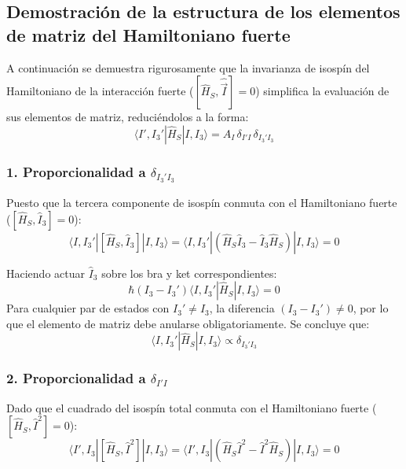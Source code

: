 \subsection{Demostración de la estructura de los elementos de matriz del Hamiltoniano fuerte}

A continuación se demuestra rigurosamente que la invarianza de isospín del Hamiltoniano de la interacción fuerte ($[\hat{H}_S, \hat{\vec{I}}] = 0$) simplifica la evaluación de sus elementos de matriz, reduciéndolos a la forma:
\begin{equation}
    \langle I', I_3' | \hat{H}_S | I, I_3 \rangle = A_I \, \delta_{I'I} \, \delta_{I_3'I_3}
\end{equation}

\subsubsection*{1. Proporcionalidad a $\delta_{I_3'I_3}$}

Puesto que la tercera componente de isospín conmuta con el Hamiltoniano fuerte ($[\hat{H}_S, \hat{I}_3] = 0$):
\begin{equation}
    \langle I, I_3' | [\hat{H}_S, \hat{I}_3] | I, I_3 \rangle = \langle I, I_3' | (\hat{H}_S \hat{I}_3 - \hat{I}_3 \hat{H}_S) | I, I_3 \rangle = 0
\end{equation}

Haciendo actuar $\hat{I}_3$ sobre los bra y ket correspondientes:
\begin{equation}
    \hbar (I_3 - I_3') \langle I, I_3' | \hat{H}_S | I, I_3 \rangle = 0
\end{equation}
Para cualquier par de estados con $I_3' \neq I_3$, la diferencia $(I_3 - I_3') \neq 0$, por lo que el elemento de matriz debe anularse obligatoriamente. Se concluye que:
\begin{equation}
    \langle I, I_3' | \hat{H}_S | I, I_3 \rangle \propto \delta_{I_3'I_3}
\end{equation}

\subsubsection*{2. Proporcionalidad a $\delta_{I'I}$}

Dado que el cuadrado del isospín total conmuta con el Hamiltoniano fuerte ($[\hat{H}_S, \hat{I}^2] = 0$):
\begin{equation}
    \langle I', I_3 | [\hat{H}_S, \hat{I}^2] | I, I_3 \rangle = \langle I', I_3 | (\hat{H}_S \hat{I}^2 - \hat{I}^2 \hat{H}_S) | I, I_3 \rangle = 0
\end{equation}

